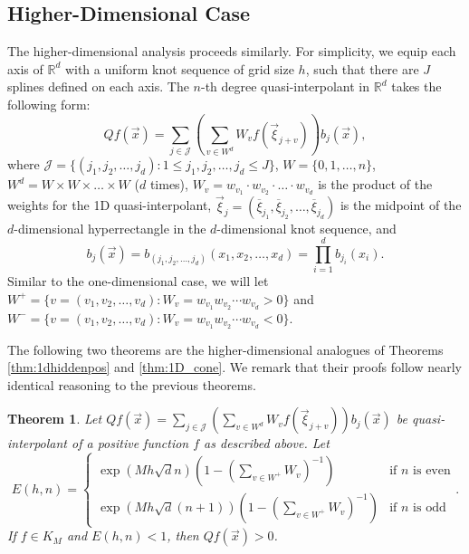 \documentclass[10pt]{article}
\newcommand{\floorn}{\lfloor \frac{n}{2}\rfloor}
\newcommand{\fracn}{\frac{n}{2}}
\newtheorem{theorem}{Theorem}[section]
\theoremstyle{definition}
\numberwithin{equation}{section}
\numberwithin{figure}{section}
\numberwithin{table}{section}
\begin{document}
\subsection{Higher-Dimensional Case}

The higher-dimensional analysis proceeds similarly. For simplicity, we equip each axis of $\mathbb{R}^d$ with a uniform knot sequence of grid size $h$, such that there are $J$ splines defined on each axis. The $n$-th degree quasi-interpolant in $\mathbb{R}^d$ takes the following form:
$$ Qf(\vec x)=\sum_{j\in \mathcal{J}}\left(\sum_{v\in W^d}W_vf(\vec\xi_{j+v})\right)b_j(\vec x),$$
where $\mathcal{J}=\{(j_1,j_2,\dots,j_d):1\leq j_1,j_2,\dots,j_d\leq J\}$, $W=\{0,1,\dots,n\}$, $W^d=W\times W\times \dots \times W$ ($d$ times), $W_v=w_{v_1}\cdot w_{v_2}\cdot\dots\cdot w_{v_d}$ is the product of the weights for the 1D quasi-interpolant, $\vec\xi_j=(\overline\xi_{j_1},\overline\xi_{j_2},\dots,\overline\xi_{j_d})$ is the midpoint of the $d$-dimensional hyperrectangle in the $d$-dimensional knot sequence, and 
$$b_j(\vec{x})=b_{(j_1,j_2,\dots,j_d)}(x_1,x_2,\dots,x_d)=\prod_{i=1}^db_{j_i}(x_i).$$ Similar to the one-dimensional case, we will let $W^+=\{v=(v_1,v_2,\dots,v_d):W_v=w_{v_1}w_{v_2}\cdots w_{v_d}>0\}$ and $W^-=\{v=(v_1,v_2,\dots,v_d):W_v=w_{v_1}w_{v_2}\cdots w_{v_d}<0\}$.

The following two theorems are the higher-dimensional analogues of Theorems \ref{thm:1dhiddenpos} and \ref{thm:1D_cone}. We remark that their proofs follow nearly identical reasoning to the previous theorems.

\begin{theorem}
Let $ Qf(\vec{x})=\sum_{j\in \mathcal{J}}\left(\sum_{v\in W^d}W_vf(\vec\xi_{j+v})\right)b_j(\vec x)$ be quasi-interpolant of a positive function $f$ as described above. Let 
$$E(h,n)=\begin{cases}
\exp(Mh\sqrt{d}n)(1-(\sum_{v\in W^+}W_v)^{-1})&\text{if $n$ is even}\\
\exp(Mh\sqrt{d}(n+1))(1-(\sum_{v\in W^+}W_v)^{-1})&\text{if $n$ is odd}
\end{cases}.$$ If $f\in K_M$ and $E(h,n)<1$, then $ Qf(\vec{x})>0$.
\label{thm:2dhiddenpos}
\end{theorem}
\end{document}
